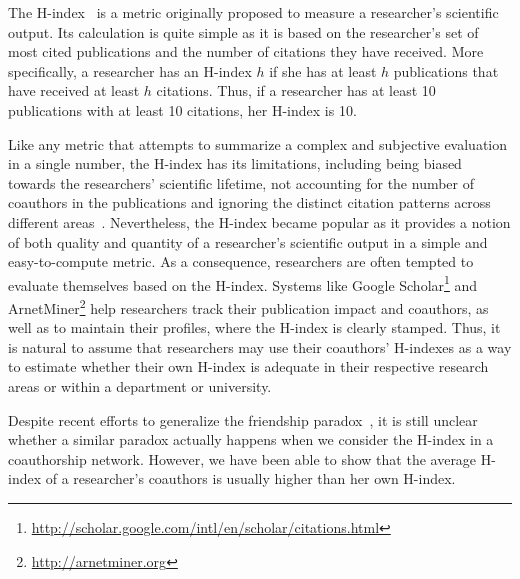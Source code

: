\documentclass[smallextended]{svjour3}
\begin{document}

The H-index~\cite{Hirsch:2005} is a metric originally proposed to measure a researcher's scientific output. Its calculation is quite simple as it is based on the researcher's set of most cited publications and the number of citations they have received.  More specifically, a researcher has an H-index $h$ if she has at least $h$ publications that have received at least $h$ citations. Thus, if a researcher has at least 10 publications with at least 10 citations, her H-index is 10.

Like any metric that attempts to summarize a complex and subjective evaluation in a single number, the H-index has its limitations, including being biased towards the researchers' scientific lifetime, not accounting for the number of coauthors in the publications and ignoring the distinct citation patterns across different areas~\cite{bornmann2005does}. Nevertheless, the H-index became popular as it provides a notion of both quality and quantity of a researcher's scientific output in a simple and easy-to-compute metric. As a consequence, researchers are often tempted to evaluate themselves based on the H-index. Systems like Google Scholar\footnote{\url{http://scholar.google.com/intl/en/scholar/citations.html}} and ArnetMiner\footnote{\url{http://arnetminer.org}} help researchers track their publication impact and coauthors, as well as to maintain their profiles, where the H-index is clearly stamped. Thus, it is natural to assume that researchers may use their coauthors' H-indexes as a way to estimate whether their own H-index is adequate in their respective research areas or within a department or university.

Despite recent efforts to generalize the friendship paradox~\cite{eom2014generalized}, it is still unclear whether a similar paradox actually happens when we consider the H-index in a coauthorship network. However, we have been able to show that the average H-index of a researcher's coauthors is usually higher than her own H-index.
\end{document}
